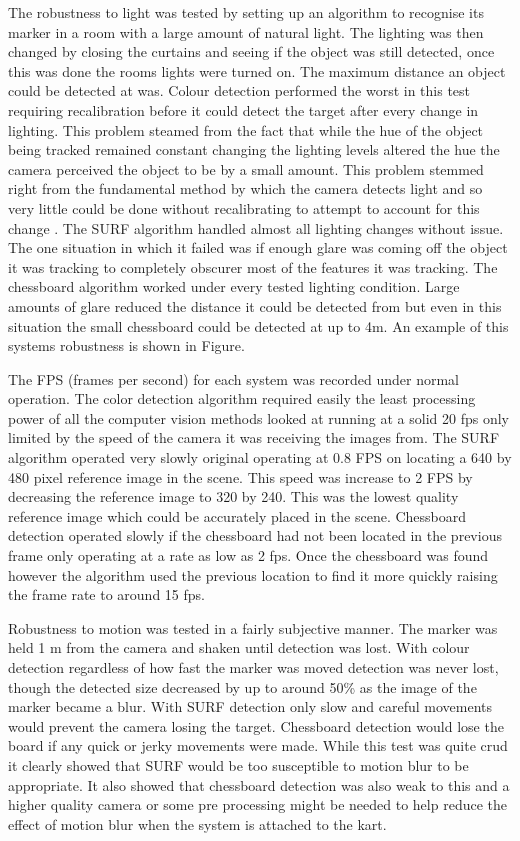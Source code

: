 The robustness to light was tested by setting up an algorithm to recognise its marker in a room with a large amount of natural light. The lighting was then changed by closing the curtains and seeing if the object was still detected, once this was done the rooms lights were turned on. The maximum distance an object could be detected at was. Colour detection performed the worst in this test requiring recalibration before it could detect the target after every change in lighting. This problem steamed from the fact that while the hue of the object being tracked remained constant changing the lighting levels altered the hue the camera perceived the object to be by a small amount. This problem stemmed right from the fundamental method by which the camera detects light and so very little could be done without recalibrating to attempt to account for this change \cite{detect}. The SURF algorithm handled almost all lighting changes without issue. The one situation in which it failed was if enough glare was coming off the object it was tracking to completely obscurer most of the features it was tracking. The chessboard algorithm worked under every tested lighting condition. Large amounts of glare reduced the distance it could be detected from but even in this situation the small chessboard could be detected at up to 4m. An example of this systems robustness is shown in Figure.

The FPS (frames per second) for each system was recorded under normal operation. The color detection algorithm required easily the least processing power of all the computer vision methods looked at running at a solid 20 fps only limited by the speed of the camera it was receiving the images from. The SURF algorithm operated very slowly original operating at 0.8 FPS on locating a 640 by 480 pixel reference image in the scene. This speed was increase to 2 FPS by decreasing the reference image to 320 by 240. This was the lowest quality reference image which could be accurately placed in the scene. Chessboard detection operated slowly if the chessboard had not been located in the previous frame only operating at a rate as low as 2 fps. Once the chessboard was found however the algorithm used the previous location to find it more quickly raising the frame rate to around 15 fps.

Robustness to motion was tested in a fairly subjective manner. The marker was held 1 m from the camera and shaken until detection was lost. With colour detection regardless of how fast the marker was moved detection was never lost, though the detected size decreased by up to around 50\% as the image of the marker became a blur. With SURF detection only slow and careful movements would prevent the camera losing the target. Chessboard detection would lose the board if any quick or jerky movements were made. While this test was quite crud it clearly showed that SURF would be too susceptible to motion blur to be appropriate. It also showed that chessboard detection was also weak to this and a higher quality camera or some pre processing might be needed to help reduce the effect of motion blur when the system is attached to the kart.

